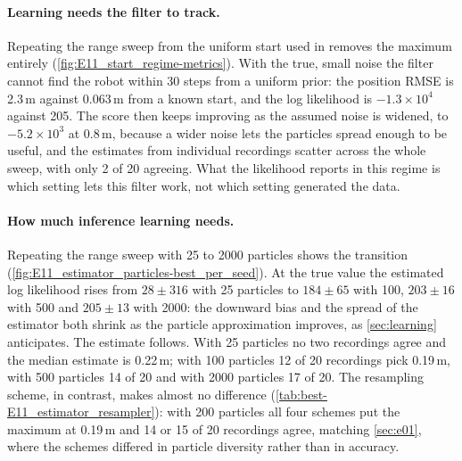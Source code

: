 \paragraph{Learning needs the filter to track.} Repeating the range sweep from the uniform start used in
 removes the maximum entirely (\cref{fig:E11_start_regime-metrics}). With the true, small
noise the filter cannot find the robot within 30 steps from a uniform prior: the position RMSE is 2.3\,m against
0.063\,m from a known start, and the log likelihood is $-1.3 \times 10^{4}$ against 205. The score then keeps
improving as the assumed noise is widened, to $-5.2 \times 10^{3}$ at 0.8\,m, because a wider noise lets the
particles spread enough to be useful, and the estimates from individual recordings scatter across the whole sweep,
with only 2 of 20 agreeing. What the likelihood reports in this regime is which setting lets this filter work, not
which setting generated the data.

\paragraph{How much inference learning needs.} Repeating the range sweep with 25 to 2000 particles shows the
transition (\cref{fig:E11_estimator_particles-best_per_seed}). At the true value the estimated log likelihood rises from
$28 \pm 316$ with 25 particles to $184 \pm 65$ with 100, $203 \pm 16$ with 500 and $205 \pm 13$ with 2000: the
downward bias and the spread of the estimator both shrink as the particle approximation improves, as
\cref{sec:learning} anticipates. The estimate follows. With 25 particles no two recordings agree and the median
estimate is 0.22\,m; with 100 particles 12 of 20 recordings pick 0.19\,m, with 500 particles 14 of 20 and with
2000 particles 17 of 20. The resampling scheme, in contrast, makes almost no difference
(\cref{tab:best-E11_estimator_resampler}): with 200 particles all four schemes put the maximum at 0.19\,m and 14 or 15
of 20 recordings agree, matching \cref{sec:e01}, where the schemes differed in particle diversity rather than in
accuracy.

